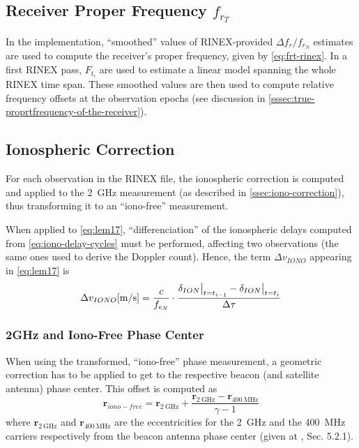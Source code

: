 \subsection{Receiver Proper Frequency $f_{r_T}$}\label{ssec:receiver-true-proper-frequency}
In the implementation, ``smoothed'' values of RINEX-provided $\Delta f_r / f_{r_N}$ estimates 
are used to compute the receiver's proper frequency, given by \autoref{eq:frt-rinex}.
In a first RINEX pass, $F_{t_i}$ are used to estimate a linear model spanning the 
whole RINEX time span. These smoothed values are then used to compute relative 
frequency offsets at the observation epochs (see discussion in \autoref{sssec:true-proprtfrequency-of-the-receiver}). 

\subsection{Ionospheric Correction}\label{ssec:iono-correction}
For each observation in the RINEX file, the ionospheric correction is computed 
and applied to the \SI{2}{\GHz} measurement (as described in \autoref{ssec:iono-correction}), 
thus transforming it to an ``iono-free'' measurement.

When applied to \autoref{eq:lem17}, ``differenciation'' of the ionospheric 
delays computed from \ref{eq:iono-delay-cycles} must be performed, affecting two 
observations (the same ones used to derive the Doppler count). Hence, the term 
$\Delta v_{IONO}$ appearing in \autoref{eq:lem17} is
\begin{equation}
  \Delta v_{IONO} [\si{\m \per \s}] = 
    \frac{c}{f_{e_N}}
    \cdot 
    \frac{\delta_{ION}\at[\big]{t=t_{i-1}} 
    - \delta_{ION}\at[\big]{t=t_i}}{\Delta \tau}
  \label{eq:dion-diff}
\end{equation}

\subsubsection{2GHz and Iono-Free Phase Center}\label{sssec:2ghz-ionofree-pco}
When using the transformed, ``iono-free'' phase measurement, a geometric correction 
has to be applied to get to the respective beacon (and satellite antenna) phase 
center. This offset is computed as
\begin{equation}\label{eq:ionf-pco}
  \bm{r}_{iono-free} = \bm{r}_{\SI{2}{\GHz}} + \frac{\bm{r}_{\SI{2}{\GHz}} 
    - \bm{r}_{\SI{400}{\MHz}}}{\gamma - 1}
\end{equation}
where $\bm{r}_{\SI{2}{\GHz}}$ and $\bm{r}_{\SI{400}{\MHz}}$ are the 
eccentricities for the \SI{2}{\GHz} and the \SI{400}{\MHz} carriers respectively 
from the beacon antenna phase center (given at \cite{DORISGSM}, Sec. 5.2.1).

